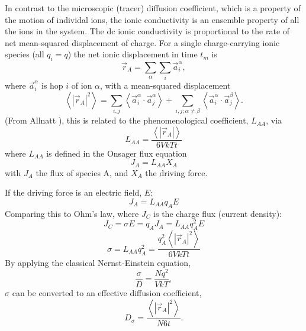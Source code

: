 \documentclass[aps,prl,twocolumn,superscriptaddress,reprint]{revtex4-1}
\begin{document}
In contrast to the microscopic (tracer) diffusion coefficient, which is a property of the motion of individal ions, the ionic conductivity is an ensemble property of all the ions in the system. The dc ionic conductivity is proportional to the rate of net mean-squared displacement of charge. For a single charge-carrying ionic species (all $q_i=q$) the net ionic displacement in time $t_m$ is
\begin{equation}
  \vec{r}_A = \sum_\alpha\sum_i\vec{a}_i^\alpha,
\end{equation}
where $\vec{a}_i^\alpha$ is hop $i$ of ion $\alpha$, with a mean-squared displacement 
\begin{equation}
  \left< \left|\vec{r}_A\right|^2 \right> = \sum_{i,j}\left< \vec{a}_i^\alpha \cdot \vec{a}_j^\alpha \right> + \sum_{i,j;\alpha\neq\beta}\left< \vec{a}_i^\alpha \cdot \vec{a}_j^\beta \right>.
\end{equation}
(From Allnatt \cite{Allnatt_JPhysC1982}), this is related to the phenomenological coefficient, $L_{AA}$, via
\begin{equation}
  L_{AA} = \frac{\left<\left|\vec{r}_A\right|\right>}{6VkTt}
\end{equation}
where $L_{AA}$ is defined in the Onsager flux equation
\begin{equation}
  J_A = L_{AA}X_A
\end{equation}
with $J_A$ the flux of species A, and $X_A$ the driving force.

If the driving force is an electric field, $E$:
\begin{equation}
  J_A = L_{AA}q_A E
\end{equation}
Comparing this to Ohm's law, where $J_C$ is the charge flux (current density):
\begin{equation}
  J_C = \sigma E = q_A J_A = L_{AA} q_A^2 E
\end{equation}
\begin{equation}
  \sigma = L_{AA}q_A^2 = \frac{q_A^2\left<\left|\vec{r}_A\right|^2\right>}{6VkTt}
\end{equation}
By applying the classical Nernst-Einstein equation, 
\begin{equation}
  \frac{\sigma}{D} = \frac{Nq^2}{VkT},
\end{equation}
$\sigma$ can be converted to an effective diffusion coefficient,
\begin{equation}
  D_\sigma = \frac{\left<\left|\vec{r}_A\right|^2\right>}{N6t}.
\end{equation}
\end{document}
